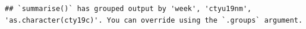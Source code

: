 \documentclass[
]{book}
\newenvironment{Shaded}{\begin{snugshade}}{\end{snugshade}}
\newcommand{\CommentTok}[1]{\textcolor[rgb]{0.56,0.35,0.01}{\textit{#1}}}
\newcommand{\DataTypeTok}[1]{\textcolor[rgb]{0.13,0.29,0.53}{#1}}
\newcommand{\KeywordTok}[1]{\textcolor[rgb]{0.13,0.29,0.53}{\textbf{#1}}}
\newcommand{\NormalTok}[1]{#1}
\newcommand{\OperatorTok}[1]{\textcolor[rgb]{0.81,0.36,0.00}{\textbf{#1}}}
\newcommand{\StringTok}[1]{\textcolor[rgb]{0.31,0.60,0.02}{#1}}
\begin{document}
\begin{Shaded}
\end{Shaded}

\begin{verbatim}
## `summarise()` has grouped output by 'week', 'ctyu19nm', 'as.character(cty19c)'. You can override using the `.groups` argument.
\end{verbatim}
\end{document}
